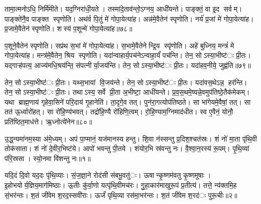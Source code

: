 तामा॒त्मनोऽधि॒ निर्मि॑मीते। यद॒ग्निरा॑धी॒यते। तस्मा॑दे॒ताव॑न्तो॒ऽग्नय॒ आधी॑यन्ते। पाङ्क्तं॒ वा इ॒द सर्वम्। पाङ्क्ते॑नै॒व पाङ्क्त स्पृणोति। अथ॑र्व पि॒तुं मे॑ गोपा॒येत्या॑ह। अन्न॑मे॒वैतेन॑ स्पृणोति। नर्य॑ प्र॒जां मे॑ गोपा॒येत्या॑ह। प्र॒जामे॒वैतेन॑ स्पृणोति। शस्य॑ प॒शून्मे॑ गोपा॒येत्या॑ह॥७८॥

प॒शूने॒वैतेन॑ स्पृणोति। सप्र॑थ स॒भां मे॑ गोपा॒येत्या॑ह। स॒भामे॒वैतेनेन्द्रि॒य स्पृ॑णोति। अहे॑ बुध्निय॒ मन्त्रं॑ मे गोपा॒येत्या॑ह। मन्त्र॑मे॒वैतेन॒ श्रिय स्पृणोति। यदा॑न्वाहार्य॒पच॑नेऽन्वाहा॒र्यं॑ पच॑न्ति। तेन॒ सोऽस्या॒भीष्ट॑ः प्री॒तः। यद्गाऱ्ह॑पत्य॒ आज्य॑मधि॒श्रय॑न्ति॒ संपत्नीर्या॒जय॑न्ति। तेन॒ सोऽस्या॒भीष्ट॑ः प्री॒तः। यदा॑हव॒नीये॒ जुह्व॑ति॥७९॥

तेन॒ सोऽस्या॒भीष्ट॑ः प्री॒तः। यथ्स॒भायां वि॒जय॑न्ते। तेन॒ सोऽस्या॒भीष्ट॑ः प्री॒तः। यदा॑वस॒थेऽन्न॒ हर॑न्ति। तेन॒ सोऽस्या॒भीष्ट॑ः प्री॒तः। तथाऽस्य॒ सर्वे प्री॒ता अ॒भीष्टा॒ आधी॑यन्ते। प्र॒व॒स॒थमे॒ष्यन्ने॒वमुप॑तिष्ठे॒तैक॑मेकम्। यथा ब्राह्म॒णाय॑ गृहेवा॒सिने॑ परि॒दाय॑ गृ॒हानेति॑। ता॒दृगे॒व तत्। पुन॑रा॒गत्योप॑तिष्ठते। सा भा॑गेयमे॒वैषां॒ तत्। सा तत॑ ऊ॒र्ध्वारो॑हत्। सा रो॑हि॒ण्य॑भवत्। तद्रो॑हि॒ण्यै रो॑हिणि॒त्वम्। रो॒हि॒ण्याम॒ग्निमाद॑धीत। स्व ए॒वैनं॒ योनौ॒ प्रति॑ष्ठित॒माध॑त्ते। ऋ॒ध्नोत्ये॑नेन॥८०॥\anuvakamend[ए॒षा प॒शून्मे॑ गोपा॒येति॒ प्रवि॑ष्टा प॒शून्मे॑ गोपा॒येत्या॑ह॒ जुह्व॑ति तिष्ठते स॒प्त च॑॥१०॥]




उ॒द्ध॒न्यमा॑नम॒स्या अ॑मे॒ध्यम्। अप॑ पा॒प्मानं॒ यज॑मानस्य हन्तु। शि॒वा न॑स्सन्तु प्र॒दिश॒श्चत॑स्रः। शं नो॑ मा॒ता पृ॑थि॒वी तोक॑साता। शं नो॑ दे॒वीर॒भिष्ट॑ये। आपो॑ भवन्तु पी॒तये। शंयोर॒भि स्र॑वन्तु नः। वै॒श्वा॒न॒रस्य॑ रू॒पम्। पृ॒थि॒व्यां प॑रि॒स्रसा। स्यो॒नमा वि॑शन्तु नः॥१॥

यदि॒दं दि॒वो यद॒दः पृ॑थि॒व्याः। सं॒ज॒ज्ञा॒ने रोद॑सी संबभू॒वतु॑ः। ऊषान्कृ॒ष्णम॑वतु कृ॒ष्णमूषाः। इ॒होभयोर्य॒ज्ञिय॒माग॑मिष्ठाः। ऊ॒तीः कु॑र्वा॒णो यत्पृ॑थि॒वीमच॑रः। गु॒हा॒कार॑माखुरू॒पं प्र॒तीत्य॑। तत्ते॒ न्य॑क्तमि॒ह सं॒भर॑न्तः। श॒तं जी॑वेम श॒रद॒स्सवी॑राः। ऊर्जं॑ पृथि॒व्या रस॑मा॒भर॑न्तः। श॒तं जी॑वेम श॒रद॑ः पुरू॒चीः॥२॥

